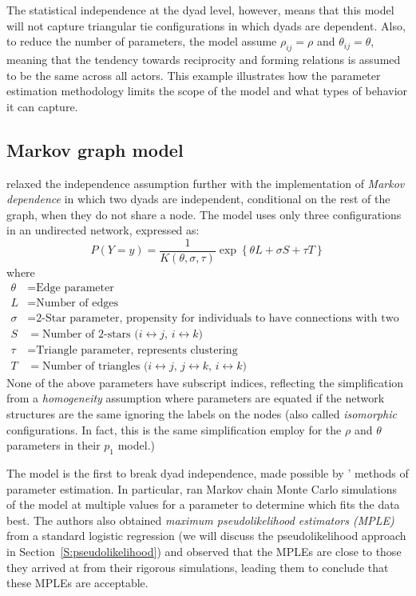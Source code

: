 The statistical independence at the dyad level, however, means that this model will 
not capture triangular tie configurations in which dyads are dependent.  Also, to 
reduce the number of parameters, the model assume $\rho_{ij} = \rho$ and $\theta_{ij} = \theta$, meaning that the 
tendency towards reciprocity and forming relations is assumed to be the same across all actors.  This example 
illustrates how the parameter estimation methodology limits the scope of the model and 
what types of behavior it can capture.  

\subsection{Markov graph model}
\citet{Frank:1986} relaxed the independence assumption further with the implementation 
of \textit{Markov dependence} in which two dyads are independent, conditional on the 
rest of the graph, when they do not share a node.  The model uses only three 
configurations in an undirected network, expressed as:
\[
	P( Y = y ) = \frac{1}{K( \theta, \sigma, \tau)}\exp 
				\left \{ \theta L + \sigma S + \tau T	\right \} 
	\]
where
\begin{align*}
	\theta &= 		\text{Edge parameter} \\
	L &= 		\text{Number of edges} \\
	\sigma &= \text{2-Star parameter, propensity for individuals to have connections 
with two actors} \\
	S &= \text{Number of 2-stars ($i \leftrightarrow j$, $i \leftrightarrow k$) }\\
	\tau	&= \text{Triangle parameter, represents clustering} \\
	T &= \text{Number of triangles ($i \leftrightarrow j$, $j \leftrightarrow k$, $i 
\leftrightarrow k$)}
\end{align*}
None of the above parameters have subscript indices, reflecting the simplification 
from a \textit{homogeneity} assumption where parameters are equated if the 
network structures are the same ignoring the labels on the nodes (also called \textit
{isomorphic} configurations.  In fact, this is the same simplification \citeauthor{Holland:1981} employ for the $\rho$ and $\theta$ parameters in their $p_1$ model.)  

The model is the first to break dyad independence, made possible by \citeauthor{Frank:1986}' methods of parameter estimation.  In particular, \citeauthor{Frank:1986} ran
Markov chain Monte Carlo simulations of the model at multiple values for a parameter 
to determine which fits the data best.  The authors also obtained \emph{maximum pseudolikelihood 
estimators (MPLE)} from a standard logistic regression (we will discuss the pseudolikelihood approach in Section~\ref{S:pseudolikelihood}) and observed that the 
MPLEs are close to those they arrived at from their rigorous simulations, leading them to conclude that these MPLEs are acceptable.  


